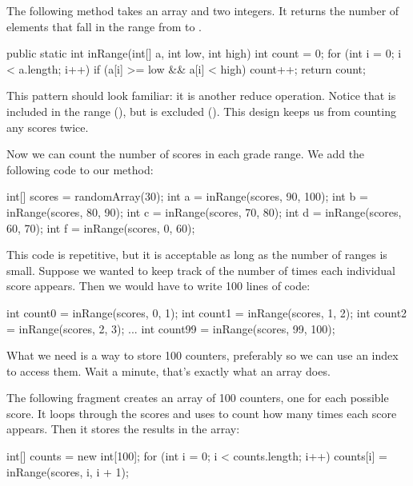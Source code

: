 The following method takes an array and two integers.
It returns the number of elements that fall in the range from  to .

\begin{code}
public static int inRange(int[] a, int low, int high) {
    int count = 0;
    for (int i = 0; i < a.length; i++) {
        if (a[i] >= low && a[i] < high) {
            count++;
        }
    }
    return count;
}
\end{code}


This pattern should look familiar: it is another reduce operation.
Notice that  is included in the range (\java{>=}), but  is excluded (\java{<}).
This design keeps us from counting any scores twice.

Now we can count the number of scores in each grade range.
We add the following code to our  method:

\begin{code}
int[] scores = randomArray(30);
int a = inRange(scores, 90, 100);
int b = inRange(scores, 80, 90);
int c = inRange(scores, 70, 80);
int d = inRange(scores, 60, 70);
int f = inRange(scores, 0, 60);
\end{code}

This code is repetitive, but it is acceptable as long as the number of ranges is small.
Suppose we wanted to keep track of the number of times each individual score appears.
Then we would have to write 100 lines of code:

\begin{code}
int count0 = inRange(scores, 0, 1);
int count1 = inRange(scores, 1, 2);
int count2 = inRange(scores, 2, 3);
...
int count99 = inRange(scores, 99, 100);
\end{code}

What we need is a way to store 100 counters, preferably so we can use an index to access them.
Wait a minute, that's exactly what an array does.

The following fragment creates an array of 100 counters, one for each possible score.
It loops through the scores and uses  to count how many times each score appears.
Then it stores the results in the  array:

\begin{code}
int[] counts = new int[100];
for (int i = 0; i < counts.length; i++) {
    counts[i] = inRange(scores, i, i + 1);
}
\end{code}

